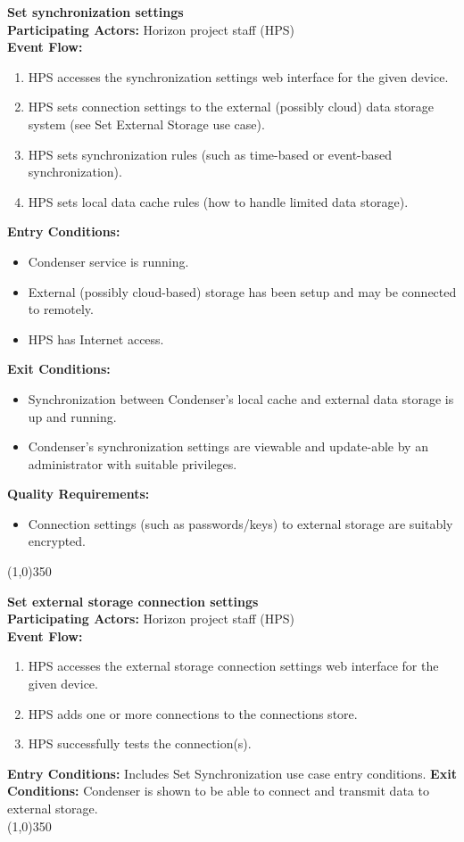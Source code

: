 		\textbf{Set synchronization settings}\\ 
		\textbf{Participating Actors:} Horizon project staff (HPS) \\
		\textbf{Event Flow:}
		\begin{enumerate}
\item HPS accesses the synchronization settings web interface for the given device.
\item HPS sets connection settings to the external (possibly cloud) data storage system (see Set External Storage use case).
\item HPS sets synchronization rules (such as time-based or event-based synchronization). 
\item HPS sets local data cache rules (how to handle limited data storage).
	    \end{enumerate}
		\textbf{Entry Conditions:}
		\begin{itemize}
\item Condenser service is running.
\item External (possibly cloud-based) storage has been setup and may be connected to remotely.
\item HPS has Internet access.
		\end{itemize}		 
		\textbf{Exit Conditions:}
		\begin{itemize}
\item Synchronization between Condenser's local cache and external data storage is up and running.
\item Condenser's synchronization settings are viewable and update-able by an administrator with suitable privileges.
		\end{itemize}			
		\textbf{Quality Requirements:}
		\begin{itemize}
\item Connection settings (such as passwords/keys) to external storage are suitably encrypted.
		\end{itemize}		
		\line(1,0){350}		

		\textbf{Set external storage connection settings}\\ 
		\textbf{Participating Actors:}  Horizon project staff (HPS)\\
		\textbf{Event Flow:}
		\begin{enumerate}
\item HPS accesses the external storage connection settings web interface for the given device.
\item HPS adds one or more connections to the connections store.
\item HPS successfully tests the connection(s).
	    \end{enumerate}
		\textbf{Entry Conditions:} Includes Set Synchronization use case entry conditions.
		\textbf{Exit Conditions:} Condenser is shown to be able to connect and transmit data to external storage.\\
		\line(1,0){350}		
		 
